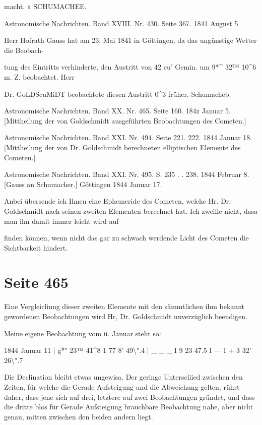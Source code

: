 \documentclass[10pt,a4paper]{article}
\begin{document}
macht. » SCHUMACHEE.

Astronomische Nachrichten. Band XVIII. Nr. 430. Seite 367. 1841 August 5.

Herr Hofrath Gauss hat am 23. Mai 1841 in Göttingen, da das ungünstige Wetter die Beobach-

tung des Eintritts verhinderte, den Austritt von 42 cu' Gemin. um 9*\textasciicircum{} 32™ 10\textasciicircum{}6 m. Z. beobachtet. Herr

Dr. GoLDScuMiDT beobachtete diesen Austritt 0\textasciicircum{}3 früher. Schumacheb.

Astronomische Nachrichten. Band XX. Nr. 465. Seite 160. 184z Januar 5. [Mittheilung der von Goldschmidt ausgeführten Beobachtungen des Cometen.]

Astronomische Nachrichten. Band XXI. Nr. 494. Seite 221. 222. 1844 Januar 18. [Mittheilung der von Dr. Goldschmidt berechneten elliptischen Elemente des Cometen.]

Astronomische Nachrichten. Band XXI. Nr. 495. S. 235 . . 238. 1844 Februar 8. [Gauss an Schumacher.] Göttingen 1844 Januar 17.

Anbei übersende ich Ihnen eine Ephemeride des Cometen, welche Hr. Dr. Goldschmidt nach seinen zweiten Elementen berechnet hat. Ich zweifle nicht, dasa man ihn damit immer leicht wird auf-

finden können, wenn nicht das gar zu schwach werdende Licht des Cometen die Sichtbarkeit hindert.


\newpage
\section*{Seite 465}
Eine Vergleicliung dieser zweiten Elemente mit den sämmtlichen ihm bekannt gewordenen Beobachtungen wird Hr, Dr. Goldschmidt unverzüglich beendigen.

Meine eigene Beobachtung vom ii. Januar steht so:

1844 Januar 11 | g*" 23™ 41\textasciicircum{}8 1 77\textdegree{} 8' 49\textbackslash{}".4 | \_ \_ \_ I 9 23 47.5 I — I + 3\textdegree{} 32' 26\textbackslash{}".7

Die Declination bleibt etwas ungewisa. Der geringe Unterscliied zwischen den Zeiten, für welche die Gerade Aufsteigung und die Abweichung gelten, rührt daher, dass jene sich auf drei, letztere auf zwei Beobachtungen gründet, und dass die dritte blos für Gerade Aufsteigung brauchbare Beobachtung nahe, aber nicht genau, mitten zwischen den beiden andern liegt.
\end{document}
